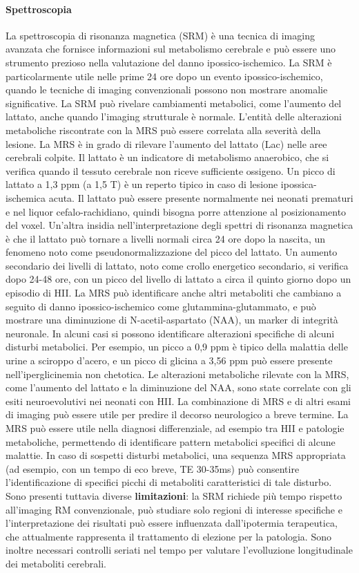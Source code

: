 \paragraph{Spettroscopia} La spettroscopia di risonanza magnetica (SRM) è una tecnica di imaging avanzata che fornisce informazioni sul metabolismo cerebrale e può essere uno strumento prezioso nella valutazione del danno ipossico-ischemico. La SRM è particolarmente utile nelle prime 24 ore dopo un evento ipossico-ischemico, quando le tecniche di imaging convenzionali possono non mostrare anomalie significative. La SRM può rivelare cambiamenti metabolici, come l'aumento del lattato, anche quando l'imaging strutturale è normale. L'entità delle alterazioni metaboliche riscontrate con la MRS può essere correlata alla severità della lesione. La MRS è in grado di rilevare l'aumento del lattato (Lac) nelle aree cerebrali colpite. Il lattato è un indicatore di metabolismo anaerobico, che si verifica quando il tessuto cerebrale non riceve sufficiente ossigeno. Un picco di lattato a 1,3 ppm (a 1,5 T) è un reperto tipico in caso di lesione ipossica-ischemica acuta. Il lattato può essere presente normalmente nei neonati prematuri e nel liquor cefalo-rachidiano, quindi bisogna porre attenzione al posizionamento del voxel. Un'altra insidia nell'interpretazione degli spettri di risonanza magnetica è che il lattato può tornare a livelli normali circa 24 ore dopo la nascita, un fenomeno noto come pseudonormalizzazione del picco del lattato. Un aumento secondario dei livelli di lattato, noto come crollo energetico secondario, si verifica dopo 24-48 ore, con un picco del livello di lattato a circa il quinto giorno dopo un episodio di HII. La MRS può identificare anche altri metaboliti che cambiano a seguito di danno ipossico-ischemico come glutammina-glutammato, e può mostrare una diminuzione di N-acetil-aspartato (NAA), un marker di integrità neuronale. In alcuni casi si possono identificare alterazioni specifiche di alcuni disturbi metabolici. Per esempio, un picco a 0,9 ppm è tipico della malattia delle urine a sciroppo d'acero, e un picco di glicina a 3,56 ppm può essere presente nell'iperglicinemia non chetotica. Le alterazioni metaboliche rilevate con la MRS, come l'aumento del lattato e la diminuzione del NAA, sono state correlate con gli esiti neuroevolutivi nei neonati con HII. La combinazione di MRS e di altri esami di imaging può essere utile per predire il decorso neurologico a breve termine. La MRS può essere utile nella diagnosi differenziale, ad esempio tra HII e patologie metaboliche, permettendo di identificare pattern metabolici specifici di alcune malattie. In caso di sospetti disturbi metabolici, una sequenza MRS appropriata (ad esempio, con un tempo di eco breve, TE 30-35ms) può consentire l'identificazione di specifici picchi di metaboliti caratteristici di tale disturbo. Sono presenti tuttavia diverse \textbf{limitazioni}: la SRM richiede più tempo rispetto all'imaging RM convenzionale, può studiare solo regioni di interesse specifiche e l'interpretazione dei risultati può essere influenzata dall'ipotermia terapeutica, che attualmente rappresenta il trattamento di elezione per la patologia. Sono inoltre necessari controlli seriati nel tempo per valutare l'evolluzione longitudinale dei metaboliti cerebrali.

